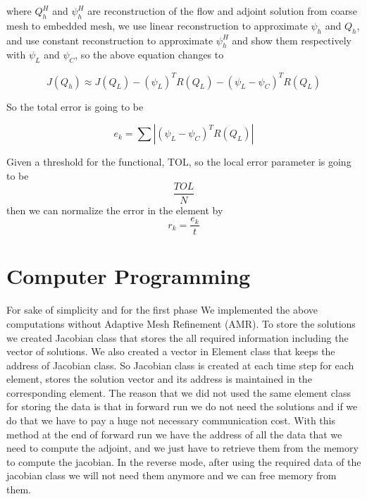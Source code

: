 \documentclass[a4paper,10pt]{article}
\begin{document}
where  $ Q^H_h $ and $ \psi^H_h $ are reconstruction of the flow and adjoint solution from coarse mesh to embedded mesh, we use linear reconstruction to approximate $ \psi_h $ and $ Q_h $, and use constant reconstruction to approximate  $ \psi^H_h $ and show them respectively with $ \psi_L $ and $ \psi_C $, so the above equation changes to 

\begin{equation}
\label{erradjmod}
J(Q_h) \approx  J(Q_L) - (\psi_L)^T R(Q_L) - (\psi_L - \psi_C)^T R(Q_L)
\end{equation}

So the total error is going to be 


\begin{equation}
\label{totalerr}
e_k=\sum |(\psi_L - \psi_C)^T R(Q_L)|
\end{equation}

Given a threshold for the functional, TOL, so the local error parameter is going to be
\begin{equation}
\frac{TOL}{N}
\end{equation} 
 then we can normalize the error in the element by
 \begin{equation}
 r_k = \frac{e_k}{t}
\end{equation} 

\section{Computer Programming}
For sake of simplicity and for the first phase We implemented the above computations without Adaptive Mesh Refinement (AMR). 
To store the solutions we created Jacobian class that stores the all required information including the vector of solutions.
We also created a vector in Element class that keeps the address of Jacobian class. So Jacobian class is created at each time step for each element, 
stores the solution vector and its address is maintained in the corresponding element. The reason that we did not used the same element class for storing 
the data is that in forward run we do not need the solutions and if we do that we have to pay a huge not necessary communication cost. 
With this method at the end of forward run we have the address of all the data that we need to compute the adjoint, and we just have 
to retrieve them from the memory to compute the jacobian. In the reverse mode, after using the required data of the jacobian class we will not need them anymore 
and we can free memory from them.
     


\end{document}
